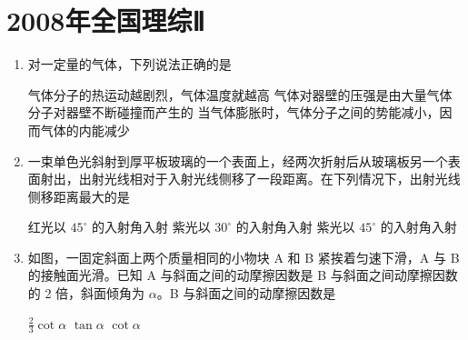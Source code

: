 \documentclass[\gkver]{gaokaozhenti}
\begin{document}
\chapter{2008年全国理综Ⅱ}

\begin{enumerate}
\item
对一定量的气体，下列说法正确的是

{气体分子的热运动越剧烈，气体温度就越高}
{气体对器壁的压强是由大量气体分子对器壁不断碰撞而产生的}
{当气体膨胀时，气体分子之间的势能减小，因而气体的内能减少}


\item
一束单色光斜射到厚平板玻璃的一个表面上，经两次折射后从玻璃板另一个表面射出，出射光线相对于入射光线侧移了一段距离。在下列情况下，出射光线侧移距离最大的是

{红光以 $45^{\circ}$ 的入射角入射}
{紫光以 $30^{\circ}$ 的入射角入射}
{紫光以 $45^{\circ}$ 的入射角入射}


\item
如图，一固定斜面上两个质量相同的小物块 A 和 B 紧挨着匀速下滑，A 与 B 的接触面光滑。已知 A 与斜面之间的动摩擦因数是 B 与斜面之间动摩擦因数的 2 倍，斜面倾角为 $\alpha$。B 与斜面之间的动摩擦因数是


{$\frac{2}{3}\cot\alpha$}
{$\tan\alpha$}
{$\cot\alpha$}



\end{enumerate}
\end{document}
